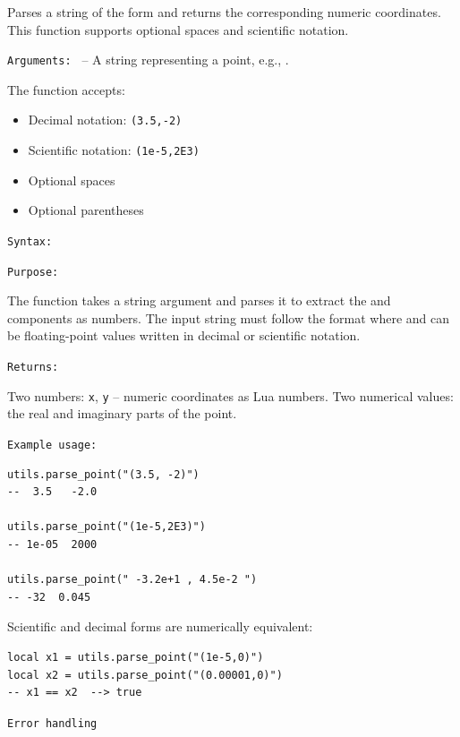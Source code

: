 Parses a string of the form  and returns the corresponding numeric coordinates. This function supports optional spaces and scientific notation.

\medskip
\texttt{Arguments: }  – A string representing a point, e.g., .

The function accepts:
\begin{itemize}
\item Decimal notation: \texttt{(3.5,-2)}
\item Scientific notation: \texttt{(1e-5,2E3)}
\item Optional spaces
\item Optional parentheses
\end{itemize}

\medskip
\texttt{Syntax: }

\begin{center}
\end{center}

\medskip
\texttt{Purpose: }

The function takes a string argument and parses it to extract the  and  components as numbers. The input string must follow the format  where  and  can be floating-point values written in decimal or scientific notation.


\medskip
\texttt{Returns: }

Two numbers: \texttt{x}, \texttt{y} – numeric coordinates as Lua numbers.
Two numerical values: the real and imaginary parts of the point.


\medskip
\texttt{Example usage: }

\begin{verbatim}
utils.parse_point("(3.5, -2)")
--  3.5   -2.0

utils.parse_point("(1e-5,2E3)")
-- 1e-05  2000

utils.parse_point(" -3.2e+1 , 4.5e-2 ")
-- -32  0.045
\end{verbatim}

Scientific and decimal forms are numerically equivalent:

\begin{verbatim}
local x1 = utils.parse_point("(1e-5,0)")
local x2 = utils.parse_point("(0.00001,0)")
-- x1 == x2  --> true
\end{verbatim}

\medskip
\texttt{Error handling}

